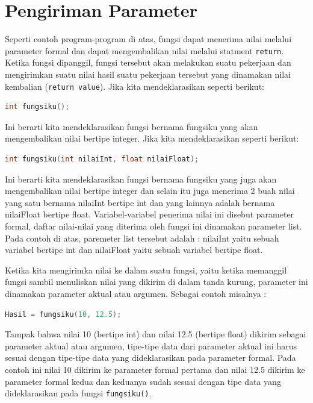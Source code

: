 \section{Pengiriman Parameter}\label{pengiriman-parameter}

Seperti contoh program-program di atas, fungsi dapat menerima nilai
melalui parameter formal dan dapat mengembalikan nilai melalui statment
\texttt{return}. Ketika fungsi dipanggil, fungsi tersebut akan melakukan
suatu pekerjaan dan mengirimkan suatu nilai hasil suatu pekerjaan
tersebut yang dinamakan nilai kembalian (\texttt{return\ value}). Jika
kita mendeklarasikan seperti berikut:

\begin{lstlisting}[language=c++, numbers=none]
int fungsiku();
\end{lstlisting}

Ini berarti kita mendeklarasikan fungsi bernama fungsiku yang akan
mengembalikan nilai bertipe integer. Jika kita mendeklarasikan seperti
berikut:

\begin{lstlisting}[language=c++, numbers=none]
int fungsiku(int nilaiInt, float nilaiFloat);
\end{lstlisting}

Ini berarti kita mendeklarasikan fungsi bernama fungsiku yang juga akan
mengembalikan nilai bertipe integer dan selain itu juga menerima 2 buah
nilai yang satu bernama nilaiInt bertipe int dan yang lainnya adalah
bernama nilaiFloat bertipe float. Variabel-variabel penerima nilai ini
disebut parameter formal, daftar nilai-nilai yang diterima oleh fungsi
ini dinamakan parameter list. Pada contoh di atas, paremeter list
tersebut adalah : nilaiInt yaitu sebuah variabel bertipe int dan
nilaiFloat yaitu sebuah variabel bertipe float.

Ketika kita mengirimka nilai ke dalam suatu fungsi, yaitu ketika
memanggil fungsi sambil menuliskan nilai yang dikirim di dalam tanda
kurung, parameter ini dinamakan parameter aktual atau argumen. Sebagai
contoh misalnya :

\begin{lstlisting}[language=c++, numbers=none]
Hasil = fungsiku(10, 12.5);
\end{lstlisting}

Tampak bahwa nilai 10 (bertipe int) dan nilai 12.5 (bertipe float)
dikirim sebagai parameter aktual atau argumen, tipe-tipe data dari
parameter aktual ini harus sesuai dengan tipe-tipe data yang
dideklarasikan pada parameter formal. Pada contoh ini nilai 10 dikirim
ke parameter formal pertama dan nilai 12.5 dikirim ke parameter formal
kedua dan keduanya sudah sesuai dengan tipe data yang dideklarasikan
pada fungsi \texttt{fungsiku()}.

